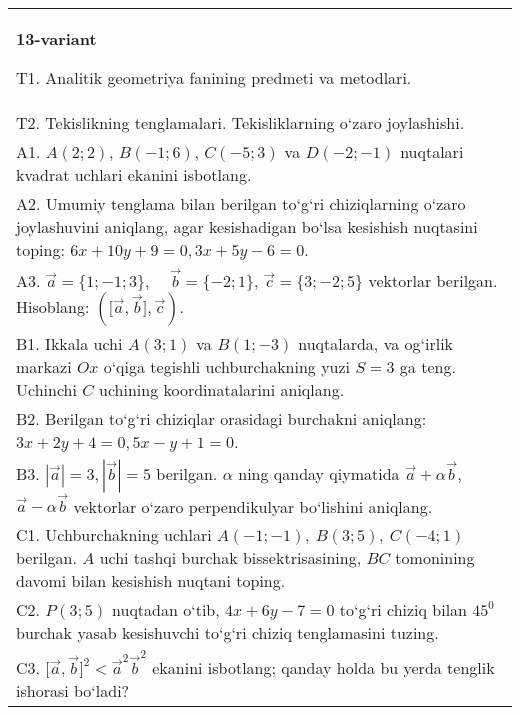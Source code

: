 \documentclass{article}
\begin{document}
\begin{tabular}{m{17cm}}
\textbf{13-variant}
\newline

T1. Analitik geometriya fanining predmeti va metodlari.
 \\
T2. 
Tekislikning tenglamalari. Tekisliklarning o‘zaro joylashishi.
 \\
A1. 
$A (2;2) $, $B (-1;6) $, $C (-5;3) $ va $D (-2;-1) $
nuqtalari kvadrat uchlari ekanini isbotlang.
 \\
A2. 
Umumiy tenglama bilan berilgan to‘g‘ri chiziqlarning
o‘zaro joylashuvini aniqlang, agar kesishadigan bo‘lsa kesishish nuqtasini
toping: $6x+10y+9=0, 3x+5y-6=0$.
 \\
A3. 
$\overrightarrow{a}
= \{ 1; - 1;3\}, \ \ \ \ \ \overrightarrow{b} = \{ - 2;1\}$, $\overrightarrow{c} = \{3; -2;5\}$ vektorlar berilgan. Hisoblang:
$ (\lbrack\overrightarrow{a},\overrightarrow{b}\rbrack,\overrightarrow{c}) $.
 \\
B1. 
Ikkala uchi \(A (3;1) \) va \(B (1;-3) \) nuqtalarda, va
og‘irlik markazi $Ox$ o‘qiga tegishli uchburchakning yuzi
\(S=3\) ga teng. Uchinchi $C$ uchining koordinatalarini aniqlang. \\
B2. 
Berilgan to‘g‘ri chiziqlar orasidagi burchakni aniqlang: $3x+2y+4=0, 5x-y+1=0$.
 \\
B3. 
$|\vec{a}| = 3,|\vec{b}| = 5$ berilgan. $\alpha$ ning qanday qiymatida $\vec{a} + \alpha\vec{b}$, $\vec{a} - \alpha\vec{b}$ vektorlar o‘zaro perpendikulyar bo‘lishini aniqlang.
 \\
C1. 
Uchburchakning uchlari
\(A (- 1; - 1),\ B (3;5),\ C (- 4;1) \) berilgan. $A$ uchi tashqi
burchak bissektrisasining, $BC$ tomonining davomi bilan kesishish
nuqtani toping.
 \\
C2. 
\(P (3;5) \) nuqtadan o‘tib, \(4x + 6y - 7 = 0\) to‘g‘ri chiziq
bilan \(45^{0}\) burchak yasab kesishuvchi to‘g‘ri chiziq tenglamasini tuzing.
 \\
C3. 
\(\lbrack\vec{a},\vec{b}\rbrack^{2} < {\vec{a}}^{2}{\vec{b}}^{2}\) ekanini isbotlang; qanday holda bu yerda tenglik ishorasi bo‘ladi?
 \\

\end{tabular}
\vspace{1cm}
\end{document}
